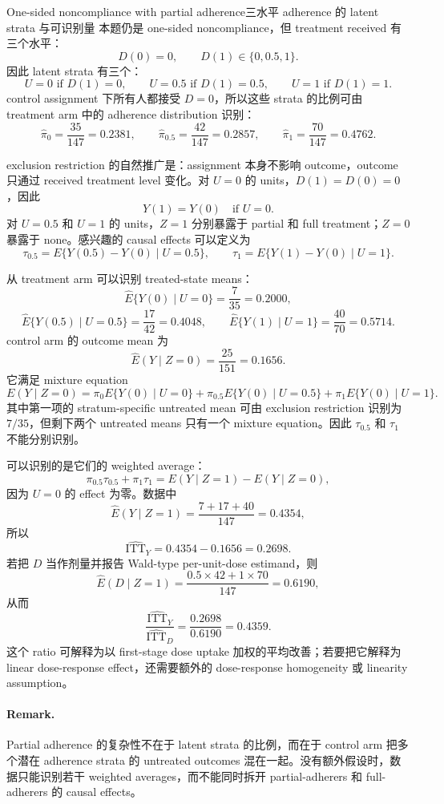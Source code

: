 \begin{exercisesolution}{One-sided noncompliance with partial adherence}{三水平 adherence 的 latent strata 与可识别量}
本题仍是 one-sided noncompliance，但 treatment received 有三个水平：
\[
D(0)=0,\qquad D(1)\in\{0,0.5,1\}.
\]
因此 latent strata 有三个：
\[
U=0 \text{ if } D(1)=0,\qquad
U=0.5 \text{ if } D(1)=0.5,\qquad
U=1 \text{ if } D(1)=1.
\]
control assignment 下所有人都接受 $D=0$，所以这些 strata 的比例可由 treatment arm 中的 adherence distribution 识别：
\[
\hat\pi_0=\frac{35}{147}=0.2381,\qquad
\hat\pi_{0.5}=\frac{42}{147}=0.2857,\qquad
\hat\pi_1=\frac{70}{147}=0.4762.
\]

exclusion restriction 的自然推广是：assignment 本身不影响 outcome，outcome 只通过 received treatment level 变化。对 $U=0$ 的 units，$D(1)=D(0)=0$，因此
\[
Y(1)=Y(0)\quad \text{if } U=0.
\]
对 $U=0.5$ 和 $U=1$ 的 units，$Z=1$ 分别暴露于 partial 和 full treatment；$Z=0$ 暴露于 none。感兴趣的 causal effects 可以定义为
\[
\tau_{0.5}=E\{Y(0.5)-Y(0)\mid U=0.5\},
\qquad
\tau_1=E\{Y(1)-Y(0)\mid U=1\}.
\]

从 treatment arm 可以识别 treated-state means：
\[
\hat E\{Y(0)\mid U=0\}=\frac{7}{35}=0.2000,
\]
\[
\hat E\{Y(0.5)\mid U=0.5\}=\frac{17}{42}=0.4048,
\qquad
\hat E\{Y(1)\mid U=1\}=\frac{40}{70}=0.5714.
\]
control arm 的 outcome mean 为
\[
\hat E(Y\mid Z=0)=\frac{25}{151}=0.1656.
\]
它满足 mixture equation
\[
E(Y\mid Z=0)
=
\pi_0 E\{Y(0)\mid U=0\}
+\pi_{0.5}E\{Y(0)\mid U=0.5\}
+\pi_1E\{Y(0)\mid U=1\}.
\]
其中第一项的 stratum-specific untreated mean 可由 exclusion restriction 识别为 $7/35$，但剩下两个 untreated means 只有一个 mixture equation。因此 $\tau_{0.5}$ 和 $\tau_1$ 不能分别识别。

可以识别的是它们的 weighted average：
\[
\pi_{0.5}\tau_{0.5}+\pi_1\tau_1
=
E(Y\mid Z=1)-E(Y\mid Z=0),
\]
因为 $U=0$ 的 effect 为零。数据中
\[
\hat E(Y\mid Z=1)=\frac{7+17+40}{147}=0.4354,
\]
所以
\[
\widehat{\mathrm{ITT}}_Y
=0.4354-0.1656
=0.2698.
\]
若把 $D$ 当作剂量并报告 Wald-type per-unit-dose estimand，则
\[
\hat E(D\mid Z=1)
=\frac{0.5\times 42+1\times 70}{147}
=0.6190,
\]
从而
\[
\frac{\widehat{\mathrm{ITT}}_Y}{\widehat{\mathrm{ITT}}_D}
=
\frac{0.2698}{0.6190}
=0.4359.
\]
这个 ratio 可解释为以 first-stage dose uptake 加权的平均改善；若要把它解释为 linear dose-response effect，还需要额外的 dose-response homogeneity 或 linearity assumption。

\paragraph{Remark.}
Partial adherence 的复杂性不在于 latent strata 的比例，而在于 control arm 把多个潜在 adherence strata 的 untreated outcomes 混在一起。没有额外假设时，数据只能识别若干 weighted averages，而不能同时拆开 partial-adherers 和 full-adherers 的 causal effects。
\end{exercisesolution}
